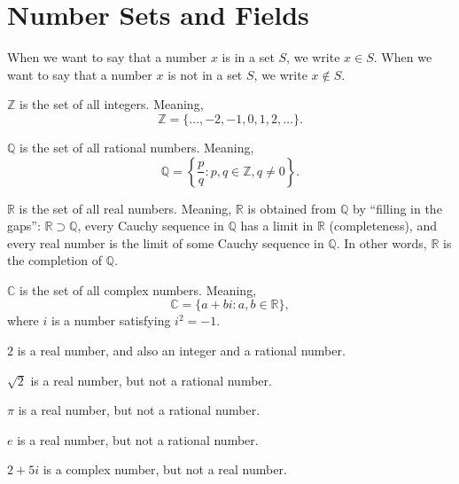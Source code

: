 \section{Number Sets and Fields}

\begin{remark}
    When we want to say that a number $x$ is in a set $S$, we write $x \in S$. When we want to say that a number $x$ is not in a set $S$, we write $x \notin S$.
\end{remark}

\begin{definition}
    $\mathbb{Z}$ is the set of all integers.
    Meaning, \[\mathbb{Z} = \{ \ldots, -2, -1, 0, 1, 2, \ldots \}.\]

    $\mathbb{Q}$ is the set of all rational numbers.
    Meaning, \[\mathbb{Q} = \left\{ \frac{p}{q} : p, q \in \mathbb{Z}, q \neq 0 \right\}.\]

    $\mathbb{R}$ is the set of all real numbers.
    Meaning, $\mathbb{R}$ is obtained from $\mathbb{Q}$ by ``filling in the gaps'': $\mathbb{R} \supset \mathbb{Q}$, every Cauchy sequence in $\mathbb{Q}$ has a limit in $\mathbb{R}$ (completeness), and every real number is the limit of some Cauchy sequence in $\mathbb{Q}$. In other words, $\mathbb{R}$ is the completion of $\mathbb{Q}$.

    $\mathbb{C}$ is the set of all complex numbers.
    Meaning, \[\mathbb{C} = \{ a + bi : a, b \in \mathbb{R} \},\] where $i$ is a number satisfying $i^2 = -1$.
\end{definition}

\begin{example}

    $2$ is a real number, and also an integer and a rational number.

    $\sqrt{2}$ is a real number, but not a rational number.

    $\pi$ is a real number, but not a rational number.

    $e$ is a real number, but not a rational number.

    $2 + 5i$ is a complex number, but not a real number.
\end{example}

